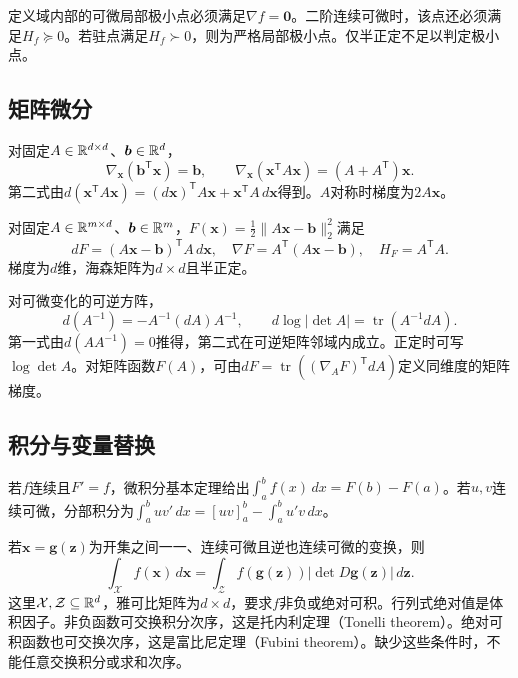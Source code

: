 定义域内部的可微局部极小点必须满足$\nabla f=\bm0$。二阶连续可微时，该点还必须满足$H_f\succeq0$。若驻点满足$H_f\succ0$，则为严格局部极小点。仅半正定不足以判定极小点。

\subsection{矩阵微分}
对固定$A\in\mathbb{R}^{d\times d}$、$\bm b\in\mathbb{R}^d$，
\begin{equation}
 \nabla_{\bm x}(\bm b^{\mathsf T}\bm x)=\bm b,\qquad
 \nabla_{\bm x}(\bm x^{\mathsf T}A\bm x)=(A+A^{\mathsf T})\bm x.
\end{equation}
第二式由$d(\bm x^{\mathsf T}A\bm x)=(d\bm x)^{\mathsf T}A\bm x+\bm x^{\mathsf T}A\,d\bm x$得到。$A$对称时梯度为$2A\bm x$。

对固定$A\in\mathbb{R}^{m\times d}$、$\bm b\in\mathbb{R}^m$，$F(\bm x)=\tfrac12\|A\bm x-\bm b\|_2^2$满足
\begin{equation}
 dF=(A\bm x-\bm b)^{\mathsf T}A\,d\bm x,\quad
 \nabla F=A^{\mathsf T}(A\bm x-\bm b),\quad H_F=A^{\mathsf T}A.
\end{equation}
梯度为$d$维，海森矩阵为$d\times d$且半正定。

对可微变化的可逆方阵，
\begin{equation}
 d(A^{-1})=-A^{-1}(dA)A^{-1},\qquad
 d\log|\det A|=\operatorname{tr}(A^{-1}dA).
\end{equation}
第一式由$d(AA^{-1})=0$推得，第二式在可逆矩阵邻域内成立。正定时可写$\log\det A$。对矩阵函数$F(A)$，可由$dF=\operatorname{tr}((\nabla_A F)^{\mathsf T}dA)$定义同维度的矩阵梯度。

\subsection{积分与变量替换}
若$f$连续且$F'=f$，微积分基本定理给出$\int_a^b f(x)\,dx=F(b)-F(a)$。若$u,v$连续可微，分部积分为$\int_a^b uv'\,dx=[uv]_a^b-\int_a^b u'v\,dx$。

若$\bm x=\bm g(\bm z)$为开集之间一一、连续可微且逆也连续可微的变换，则
\begin{equation}
 \int_{\mathcal X}f(\bm x)\,d\bm x
 =\int_{\mathcal Z}f(\bm g(\bm z))|\det D\bm g(\bm z)|\,d\bm z.
\end{equation}
这里$\mathcal X,\mathcal Z\subseteq\mathbb{R}^d$，雅可比矩阵为$d\times d$，要求$f$非负或绝对可积。行列式绝对值是体积因子。非负函数可交换积分次序，这是托内利定理（Tonelli theorem）。绝对可积函数也可交换次序，这是富比尼定理（Fubini theorem）。缺少这些条件时，不能任意交换积分或求和次序。

